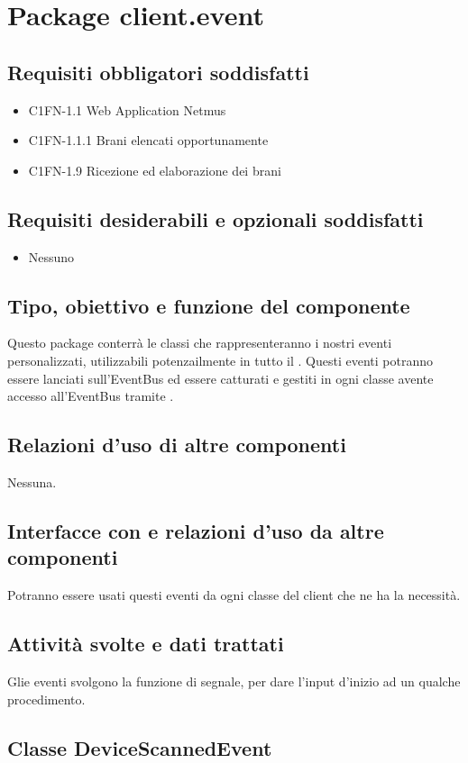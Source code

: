 \newpage
\section{Package client.event}
\subsection*{Requisiti obbligatori soddisfatti}
\begin{itemize}
    \item C1FN-1.1 Web Application Netmus
    \item C1FN-1.1.1 Brani elencati opportunamente
    \item C1FN-1.9 Ricezione ed elaborazione dei brani
\end{itemize}
\subsection*{Requisiti desiderabili e opzionali soddisfatti}
\begin{itemize}
    \item Nessuno
\end{itemize}
\subsection*{Tipo, obiettivo e funzione del componente}
Questo package conterr\`a le classi che rappresenteranno i nostri eventi
personalizzati, utilizzabili potenzailmente in tutto il .
Questi eventi potranno essere lanciati sull'EventBus ed essere catturati e
gestiti in ogni classe avente accesso all'EventBus tramite .
\subsection*{Relazioni d'uso di altre componenti}
Nessuna.
\subsection*{Interfacce con e relazioni d'uso da altre componenti}
Potranno essere usati questi eventi da ogni classe del client che ne ha la
necessit\`a.
\subsection*{Attivit\`a svolte e dati trattati}
Glie eventi svolgono la funzione di segnale, per dare l'input d'inizio ad un
qualche procedimento.

\subsection{Classe DeviceScannedEvent}
